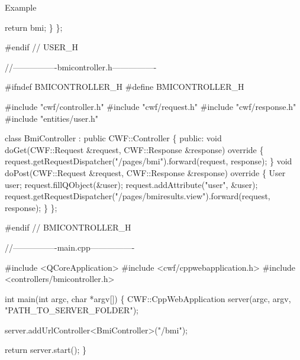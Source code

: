 \begin{DoxyParagraph}{Example}
\begin{DoxyCode}
        \textcolor{keywordflow}{return} bmi;
    \}
\};

\textcolor{preprocessor}{#endif // USER\_H}

\textcolor{comment}{//----------------bmicontroller.h----------------}

\textcolor{preprocessor}{#ifndef BMICONTROLLER\_H}
\textcolor{preprocessor}{#define BMICONTROLLER\_H}

\textcolor{preprocessor}{#include "cwf/controller.h"}
\textcolor{preprocessor}{#include "cwf/request.h"}
\textcolor{preprocessor}{#include "cwf/response.h"}
\textcolor{preprocessor}{#include "entities/user.h"}

\textcolor{keyword}{class }BmiController : \textcolor{keyword}{public} CWF::Controller
\{
\textcolor{keyword}{public}:
    \textcolor{keywordtype}{void} doGet(CWF::Request &request, CWF::Response &response)\textcolor{keyword}{ override}
\textcolor{keyword}{    }\{
        request.getRequestDispatcher(\textcolor{stringliteral}{"/pages/bmi"}).forward(request, response);
    \}
    \textcolor{keywordtype}{void} doPost(CWF::Request &request, CWF::Response &response)\textcolor{keyword}{ override}
\textcolor{keyword}{    }\{
        User user;
        request.fillQObject(&user);
        request.addAttribute(\textcolor{stringliteral}{"user"}, &user);
        request.getRequestDispatcher(\textcolor{stringliteral}{"/pages/bmiresults.view"}).forward(request, response);
    \}
\};

\textcolor{preprocessor}{#endif // BMICONTROLLER\_H}

\textcolor{comment}{//----------------main.cpp----------------}

\textcolor{preprocessor}{#include <QCoreApplication>}
\textcolor{preprocessor}{#include <cwf/cppwebapplication.h>}
\textcolor{preprocessor}{#include <controllers/bmicontroller.h>}

\textcolor{keywordtype}{int} main(\textcolor{keywordtype}{int} argc, \textcolor{keywordtype}{char} *argv[])
\{
    CWF::CppWebApplication server(argc, argv, \textcolor{stringliteral}{"PATH\_TO\_SERVER\_FOLDER"});

    server.addUrlController<BmiController>(\textcolor{stringliteral}{"/bmi"});

    \textcolor{keywordflow}{return} server.start();
\}
\end{DoxyCode}
 
\end{DoxyParagraph}
\mbox{\label{class_request_adeb678695298dab6ae617e87aaa4f312}} 
